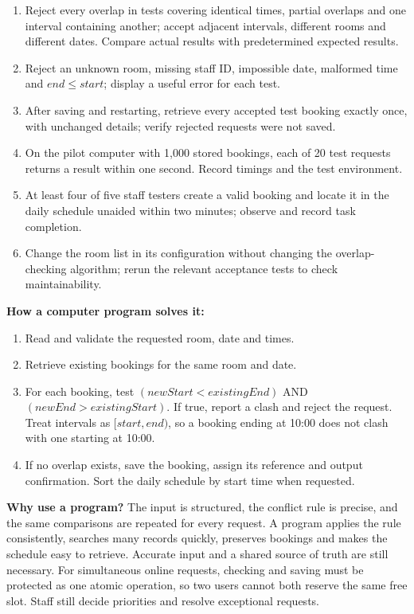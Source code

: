 \documentclass[a4paper,12pt]{article}
\begin{document}
\begin{enumerate}
    \item Reject every overlap in tests covering identical times, partial overlaps and one interval containing another; accept adjacent intervals, different rooms and different dates. Compare actual results with predetermined expected results.
    \item Reject an unknown room, missing staff ID, impossible date, malformed time and $end \leq start$; display a useful error for each test.
    \item After saving and restarting, retrieve every accepted test booking exactly once, with unchanged details; verify rejected requests were not saved.
    \item On the pilot computer with 1,000 stored bookings, each of 20 test requests returns a result within one second. Record timings and the test environment.
    \item At least four of five staff testers create a valid booking and locate it in the daily schedule unaided within two minutes; observe and record task completion.
    \item Change the room list in its configuration without changing the overlap-checking algorithm; rerun the relevant acceptance tests to check maintainability.
\end{enumerate}
\textbf{How a computer program solves it:}
\begin{enumerate}
    \item Read and validate the requested room, date and times.
    \item Retrieve existing bookings for the same room and date.
    \item For each booking, test $(newStart < existingEnd)$ AND $(newEnd > existingStart)$. If true, report a clash and reject the request. Treat intervals as $[start,end)$, so a booking ending at 10:00 does not clash with one starting at 10:00.
    \item If no overlap exists, save the booking, assign its reference and output confirmation. Sort the daily schedule by start time when requested.
\end{enumerate}
\textbf{Why use a program?} The input is structured, the conflict rule is precise, and the same comparisons are repeated for every request. A program applies the rule consistently, searches many records quickly, preserves bookings and makes the schedule easy to retrieve. Accurate input and a shared source of truth are still necessary. For simultaneous online requests, checking and saving must be protected as one atomic operation, so two users cannot both reserve the same free slot. Staff still decide priorities and resolve exceptional requests.
\end{document}
